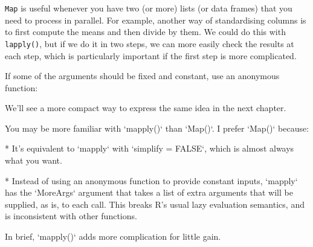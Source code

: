 \texttt{Map} is useful whenever you have two (or more) lists (or data
frames) that you need to process in parallel. For example, another way
of standardising columns is to first compute the means and then divide
by them. We could do this with \texttt{lapply()}, but if we do it in two
steps, we can more easily check the results at each step, which is
particularly important if the first step is more complicated.

\begin{Shaded}
\begin{Highlighting}[]
\StringTok{ }
\StringTok{ }\NormalTok{(}\DataTypeTok{/}

\StringTok{ }\StringTok{ }
\end{Highlighting}
\end{Shaded}

If some of the arguments should be fixed and constant, use an anonymous
function:

\begin{Shaded}
\begin{Highlighting}[]
 
\end{Highlighting}
\end{Shaded}

We'll see a more compact way to express the same idea in the next
chapter.

\begin{shortbox}

\begin{minipage}{25pc}

You may be more familiar with `mapply()` than `Map()`. I prefer `Map()` because:

* It's equivalent to `mapply` with `simplify = FALSE`, which is almost always 
  what you want.

* Instead of using an anonymous function to provide constant inputs, `mapply` 
  has the `MoreArgs` argument that takes a list of extra arguments that will 
  be supplied, as is, to each call. This breaks R's usual lazy evaluation 
  semantics, and is inconsistent with other functions.

In brief, `mapply()` adds more complication for little gain. 

\end{minipage}

\end{shortbox}

